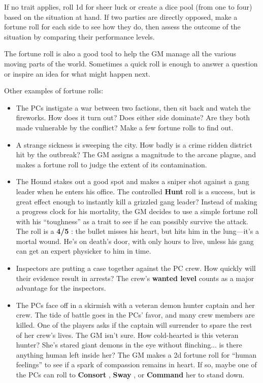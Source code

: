 \documentclass[11pt,fleqn,a5paper]{book}
\newcommand{\gameterm}[1]{\textbf{#1}}
\begin{document}
If no trait applies, roll 1d for sheer luck or create a dice pool (from one to four) based on the situation at hand. If two parties are directly opposed, make a fortune roll for each side to see how they do, then assess the outcome of the situation by comparing their performance levels.

The fortune roll is also a good tool to help the GM manage all the various moving parts of the world. Sometimes a quick roll is enough to answer a question or inspire an idea for what might happen next.

Other examples of fortune rolls:

\begin{itemize}
	\item The PCs instigate a war between two factions, then sit back and watch the fireworks. How does it turn out? Does either side dominate? Are they both made vulnerable by the conflict? Make a few fortune rolls to find out.
	\item A strange sickness is sweeping the city. How badly is a crime ridden district hit by the outbreak? The GM assigns a magnitude to the arcane plague, and makes a fortune roll to judge the extent of its contamination.
	\item The Hound stakes out a good spot and makes a sniper shot against a gang leader when he enters his office. The controlled \gameterm{Hunt}  roll is a success, but is great effect enough to instantly kill a grizzled gang leader? Instead of making a progress clock for his mortality, the GM decides to use a simple fortune roll with his “toughness” as a trait to see if he can possibly survive the attack. The roll is a \gameterm{4/5} : the bullet misses his heart, but hits him in the lung---it’s a mortal wound. He’s on death’s door, with only hours to live, unless his gang can get an expert physicker to him in time.
	\item Inspectors are putting a case together against the PC crew. How quickly will their evidence result in arrests? The crew’s \gameterm{wanted level}  counts as a major advantage for the inspectors.
	\item The PCs face off in a skirmish with a veteran demon hunter captain and her crew. The tide of battle goes in the PCs’ favor, and many crew members are killed. One of the players asks if the captain will surrender to spare the rest of her crew’s lives. The GM isn’t sure. How cold-hearted is this veteran hunter? She’s stared giant demons in the eye without flinching... is there anything human left inside her? The GM makes a 2d fortune roll for “human feelings” to see if a spark of compassion remains in heart. If so, maybe one of the PCs can roll to \gameterm{Consort} , \gameterm{Sway} , or \gameterm{Command}  her to stand down.
\end{itemize}
\end{document}
